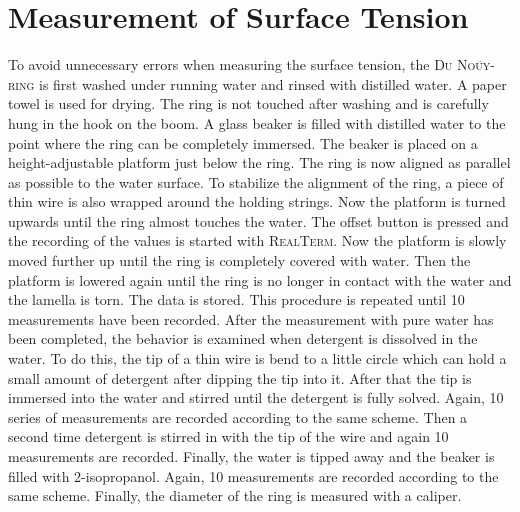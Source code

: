 \section{Measurement of Surface Tension} \label{sec:Surface_Tension}
To avoid unnecessary errors when measuring the surface tension, the \textsc{Du Noüy-ring} is first washed under running water and rinsed with distilled water. A paper towel is used for drying. The ring is not touched after washing and is carefully hung in the hook on the boom. A glass beaker is filled with distilled water to the point where the ring can be completely immersed. The beaker is placed on a height-adjustable platform just below the ring. The ring is now aligned as parallel as possible to the water surface. To stabilize the alignment of the ring, a piece of thin wire is also wrapped around the holding strings. Now the platform is turned upwards until the ring almost touches the water. The offset button is pressed and the recording of the values is started with \textsc{RealTerm}. Now the platform is slowly moved further up until the ring is completely covered with water. Then the platform is lowered again until the ring is no longer in contact with the water and the lamella is torn. The data is stored. This procedure is repeated until 10 measurements have been recorded. After the measurement with pure water has been completed, the behavior is examined when detergent is dissolved in the water. To do this, the tip of a thin wire is bend to a little circle which can hold a small amount of detergent after dipping the tip into it. After that the tip is immersed into the water and stirred until the detergent is fully solved. Again, 10 series of measurements are recorded according to the same scheme. Then a second time detergent is stirred in with the tip of the wire and again 10 measurements are recorded. Finally, the water is tipped away and the beaker is filled with 2-isopropanol. Again, 10 measurements are recorded according to the same scheme. Finally, the diameter of the ring is measured with a caliper.
